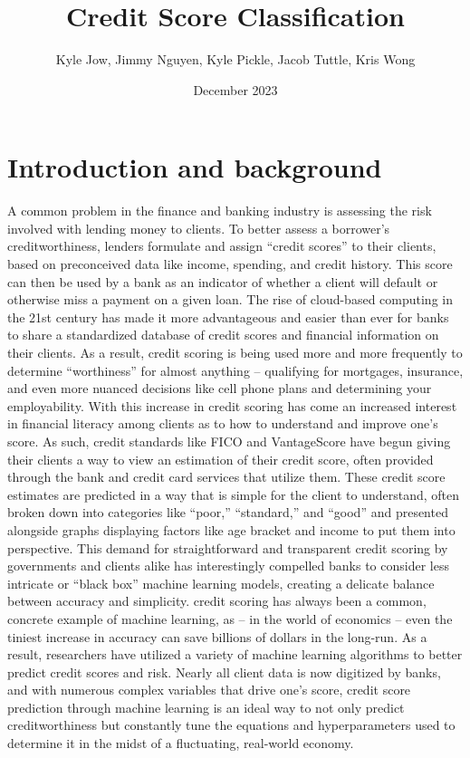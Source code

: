 \documentclass{article}
\title{\textbf{Credit Score Classification}}
\author{Kyle Jow, Jimmy Nguyen, Kyle Pickle, Jacob Tuttle, Kris Wong}
\date{December 2023}
\begin{document}
\maketitle
\newpage
{}
\pagestyle{fancy}
\fancyhf{} %
\fancyfoot[R]{\thepage}
\section*{Introduction and background}
A common problem in the finance and banking industry is assessing the risk involved with lending money to clients.
To better assess a borrower's creditworthiness, lenders formulate and assign “credit scores” to their clients, based on preconceived data 
like income, spending, and credit history.
This score can then be used by a bank as an indicator of whether a client will default or otherwise miss a payment on a given loan.
The rise of cloud-based computing in the 21st century has made it more advantageous and easier than ever for banks to share a
standardized database of credit scores and financial information on their clients.
As a result, credit scoring is being used more and more frequently to determine “worthiness” for almost anything -- qualifying for
mortgages, insurance, and even more nuanced decisions like cell phone plans and determining your employability.
\vspace{5mm}\newline
With this increase in credit scoring has come an increased interest in financial literacy among clients as to how to understand and improve
one's score.
As such, credit standards like FICO and VantageScore have begun giving their clients a way to view an estimation of their credit score, often
provided through the bank and credit card services that utilize them.
These credit score estimates are predicted in a way that is simple for the client to understand, often broken down into categories like
“poor,” “standard,” and “good” and presented alongside graphs displaying factors like age bracket and income to put them into perspective.
This demand for straightforward and transparent credit scoring by governments and clients alike has interestingly compelled banks to
consider less intricate or “black box” machine learning models, creating a delicate balance between accuracy and simplicity.
\vspace{5mm}\newline
credit scoring has always been a common, concrete example of machine learning, as -- in the world of economics -- even the tiniest increase
in accuracy can save billions of dollars in the long-run.
As a result, researchers have utilized a variety of machine learning algorithms to better predict credit scores and risk.
Nearly all client data is now digitized by banks, and with numerous complex variables that drive one's score, credit score prediction
through machine learning is an ideal way to not only predict creditworthiness but constantly tune the equations and hyperparameters used
to determine it in the midst of a fluctuating, real-world economy.
\end{document}
